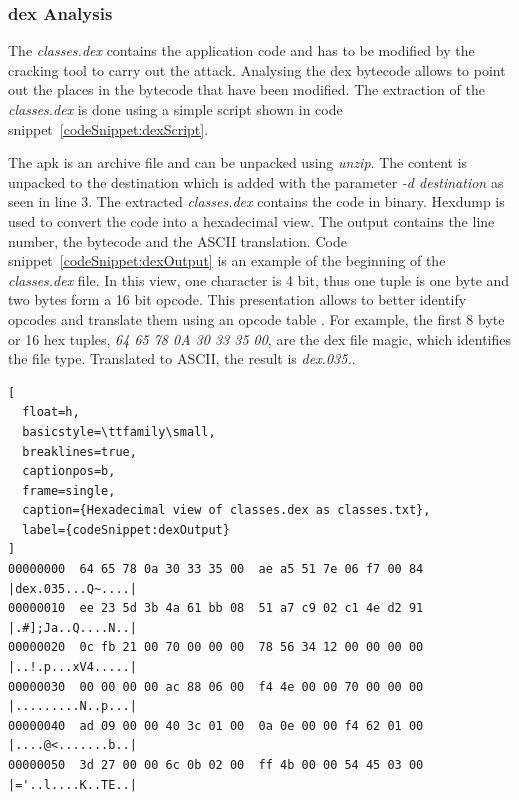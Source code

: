 \subsubsection{dex Analysis} \label{subsection:tools-dex}
The \textit{classes.dex} contains the application code and has to be modified by the cracking tool to carry out the attack.
Analysing the dex bytecode allows to point out the places in the bytecode that have been modified.
\newline
The extraction of the \textit{classes.dex} is done using a simple script shown in code snippet~\ref{codeSnippet:dexScript}.
\newline

The \gls{apk} is an archive file and can be unpacked using \textit{unzip}.
The content is unpacked to the destination which is added with the parameter \textit{-d destination} as seen in line 3.
The extracted \textit{classes.dex} contains the code in binary.
Hexdump is used to convert the code into a hexadecimal view.
\newline
The output contains the line number, the bytecode and the ASCII translation.
Code snippet~\ref{codeSnippet:dexOutput} is an example of the beginning of the \textit{classes.dex} file.
In this view, one character is 4 bit, thus one tuple is one byte and two bytes form a 16 bit opcode.
This presentation allows to better identify opcodes and translate them using an opcode table \cite{opcodes}.
For example, the first 8 byte or 16 hex tuples, \textit{64 65 78 0A 30 33 35 00}, are the \gls{dex} file magic, which identifies the file type.
Translated to ASCII, the result is \textit{dex.035.}.
\begin{lstlisting}[
  float=h,
  basicstyle=\ttfamily\small,
  breaklines=true,
  captionpos=b,
  frame=single,
  caption={Hexadecimal view of classes.dex as classes.txt},
  label={codeSnippet:dexOutput}
]
00000000  64 65 78 0a 30 33 35 00  ae a5 51 7e 06 f7 00 84  |dex.035...Q~....|
00000010  ee 23 5d 3b 4a 61 bb 08  51 a7 c9 02 c1 4e d2 91  |.#];Ja..Q....N..|
00000020  0c fb 21 00 70 00 00 00  78 56 34 12 00 00 00 00  |..!.p...xV4.....|
00000030  00 00 00 00 ac 88 06 00  f4 4e 00 00 70 00 00 00  |.........N..p...|
00000040  ad 09 00 00 40 3c 01 00  0a 0e 00 00 f4 62 01 00  |....@<.......b..|
00000050  3d 27 00 00 6c 0b 02 00  ff 4b 00 00 54 45 03 00  |='..l....K..TE..|
\end{lstlisting}

